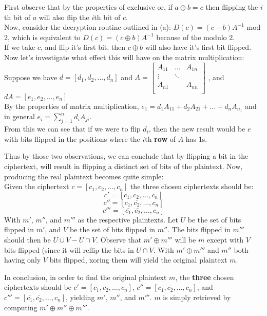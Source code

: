 \documentclass[12pt]{article}
\begin{document}
\begin{list}{.}{}
\begin{list}{()}{}
\item First observe that by the properties of exclusive or, if $a \oplus b =
c$ then flipping the $i$th bit of $a$ will also flip the $i$th bit of $c$.\\
Now, consider the decryption routine outlined in (a): $D(c) = (c - b)A^{-1}$ mod
2, which is equivalent to $D(c) = (c \oplus b)A^{-1}$ because of the modulo 2.\\
If we take $c$, and flip it's first bit, then $c \oplus b$ will also have it's
first bit flipped.  Now let's investigate what effect this will have on the
matrix multiplication:\\
Suppose we have $d = [ d_1, d_2, ..., d_n ]$ and
$A = \left[\begin{array}{ccc}
A_{11} & \dots & A_{1n}\\
\vdots & \ddots\\
A_{n1} & & A_{nn}\\
\end{array} \right]$ , and $dA = [ e_1, e_2, \dots, e_n ]$\\
By the properties of matrix multiplication, $e_1 = d_1A_{11} + d_2A_{21} + \dots
+ d_nA_{n_1}$ and in general $e_i = \sum^n_{j=1}d_iA_{ji}$.\\
From this we can see that if we were to flip $d_i$, then the new result would be
$e$ with bits flipped in the positions where the $i$th \textbf{row} of $A$ has
1s.

Thus by those two observations, we can conclude that by flipping a bit in the
ciphertext, will result in flipping a distinct set of bits of the plaintext.
Now, producing the real plaintext becomes quite simple:\\
Given the ciphertext $c = [ c_1, c_2, \dots, c_n ]$ the three chosen ciphertexts
should be:\\
\[ c' = [ \overline{c_1}, c_2, \dots, c_n ] \]
\[ c'' = [ c_1, \overline{c_2}, \dots, c_n ] \]
\[ c''' = [ \overline{c_1}, \overline{c_2}, \dots, c_n ] \]
With $m'$, $m''$, and $m'''$ as the respective plaintexts.  Let $U$ be the set
of bits flipped in $m'$, and $V$ be the set of bits flipped in $m''$.  The bits
flipped in $m'''$ should then be $U \cup V - U \cap V$.  Observe that $m' \oplus
m'''$ will be $m$ except with $V$ bits flipped (since it will reflip
the bits in $U \cap V$.  With $m' \oplus m'''$ and $m''$ both having only $V$
bits flipped, xoring them will yield the original plaintext $m$.

In conclusion, in order to find the original plaintext $m$, the \textbf{three}
chosen ciphertexts should be $c' = [ \overline{c_1}, c_2, \dots, c_n ]$,
$c'' = [ c_1, \overline{c_2}, \dots, c_n ]$, and
$c''' = [ \overline{c_1}, \overline{c_2}, \dots, c_n ]$, yielding $m'$, $m''$,
and $m'''$.  $m$ is simply retrieved by computing $m' \oplus m'' \oplus m'''$.
\end{list}


\end{list}
\end{document}
